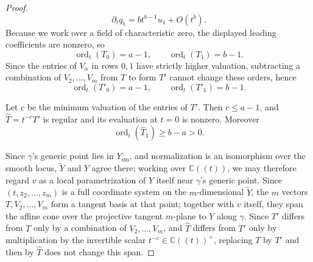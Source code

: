 \documentclass[11pt]{amsart}
\numberwithin{equation}{section}
\theoremstyle{plain}
\theoremstyle{remark}
\begin{document}
\begin{proof}
\[ \partial_tq_1=b t^{b-1}u_1+O(t^b).\]
Because we work over a field of characteristic zero, the displayed
leading coefficients are nonzero, so
\begin{equation} \operatorname{ord}_t(T_0)=a-1,\qquad \operatorname{ord}_t(T_1)=b-1.
 \label{eq:T-orders-raw}\end{equation}
Since the entries of $V_\alpha$ in rows $0,1$ have strictly higher
valuation, subtracting a combination of $V_2,\ldots,V_m$ from $T$ to form
$T'$ cannot change these orders, hence
\begin{equation} \operatorname{ord}_t(T'_0)=a-1,\qquad\operatorname{ord}_t(T'_1)=b-1.
\label{eq:T-orders}\end{equation}

Let $c$ be the minimum valuation of the entries of $T'$. Then $c\leq a-1$,
and $\widehat T=t^{-c}T'$ is regular and its evaluation at $t=0$ is nonzero. Moreover
\begin{equation}\operatorname{ord}_t(\widehat T_1)\geq b-a>0.
 \label{eq:T1-vanish}\end{equation}

Since $\gamma$'s generic point lies in $Y_{\mathrm{sm}}$, and
normalization is an isomorphism over the smooth locus,
 $\widetilde Y$ and
$Y$ agree there; working over $\mathbb C((t))$, we may therefore regard
$v$ as a local parametrization of $Y$ itself near $\gamma$'s
generic point.
Since $(t,z_2,\ldots,z_m)$ is a full coordinate system on the
$m$-dimensional $\widetilde Y$, the $m$ vectors $T,V_2,\ldots,V_m$ form a
tangent basis at that point; together with $v$ itself, they span the
affine cone over the projective tangent $m$-plane to $Y$ along $\gamma$.
Since $T'$ differs from $T$ only by a combination of $V_2,\ldots,V_m$, and
$\widehat T$ differs from $T'$ only by multiplication by the invertible
scalar $t^{-c}\in\mathbb C((t))^\times$, replacing $T$ by $T'$ and then by
$\widehat T$ does not change this span.


\end{proof}
\end{document}
